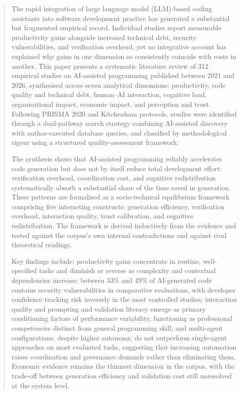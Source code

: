\date{Received: date / Accepted: date}


\maketitle

\begin{abstract}
The rapid integration of large language model (LLM)-based coding assistants into software development practice has generated a substantial but fragmented empirical record. Individual studies report measurable productivity gains alongside increased technical debt, security vulnerabilities, and verification overhead, yet no integrative account has explained why gains in one dimension so consistently coincide with costs in another. This paper presents a systematic literature review of 312 empirical studies on AI-assisted programming published between 2021 and 2026, synthesised across seven analytical dimensions: productivity, code quality and technical debt, human--AI interaction, cognitive load, organisational impact, economic impact, and perception and trust. Following PRISMA 2020 and Kitchenham protocols, studies were identified through a dual-pathway search strategy combining AI-assisted discovery with author-executed database queries, and classified by methodological rigour using a structured quality-assessment framework.

The synthesis shows that AI-assisted programming reliably accelerates code generation but does not by itself reduce total development effort: verification overhead, coordination cost, and cognitive redistribution systematically absorb a substantial share of the time saved in generation. These patterns are formalised as a socio-technical equilibrium framework comprising five interacting constructs: generation efficiency, verification overhead, interaction quality, trust calibration, and cognitive redistribution. The framework is derived inductively from the evidence and tested against the corpus's own internal contradictions and against rival theoretical readings.

Key findings include: productivity gains concentrate in routine, well-specified tasks and diminish or reverse as complexity and contextual dependencies increase; between 33\% and 49\% of AI-generated code contains security vulnerabilities in comparative evaluations, with developer confidence tracking risk inversely in the most controlled studies; interaction quality and prompting and validation literacy emerge as primary conditioning factors of performance variability, functioning as professional competencies distinct from general programming skill; and multi-agent configurations, despite higher autonomy, do not outperform single-agent approaches on most evaluated tasks, suggesting that increasing automation raises coordination and governance demands rather than eliminating them. Economic evidence remains the thinnest dimension in the corpus, with the trade-off between generation efficiency and validation cost still unresolved at the system level.


\end{abstract}

